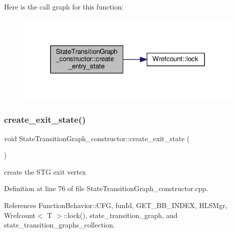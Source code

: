 Here is the call graph for this function\+:
\nopagebreak
\begin{figure}[H]
\begin{center}
\leavevmode
\includegraphics[width=311pt]{de/dbb/classStateTransitionGraph__constructor_a5bf451d9586402376ceb07442838858a_cgraph}
\end{center}
\end{figure}
\mbox{\label{classStateTransitionGraph__constructor_abe773f14021e94e12138829387c8fb54}} 
\subsubsection{\texorpdfstring{create\+\_\+exit\+\_\+state()}{create\_exit\_state()}}
{\footnotesize\ttfamily void State\+Transition\+Graph\+\_\+constructor\+::create\+\_\+exit\+\_\+state (\begin{DoxyParamCaption}{ }\end{DoxyParamCaption})}



create the S\+TG exit vertex 



Definition at line 76 of file State\+Transition\+Graph\+\_\+constructor.\+cpp.



References Function\+Behavior\+::\+C\+FG, fun\+Id, G\+E\+T\+\_\+\+B\+B\+\_\+\+I\+N\+D\+EX, H\+L\+S\+Mgr, Wrefcount$<$ T $>$\+::lock(), state\+\_\+transition\+\_\+graph, and state\+\_\+transition\+\_\+graphs\+\_\+collection.


